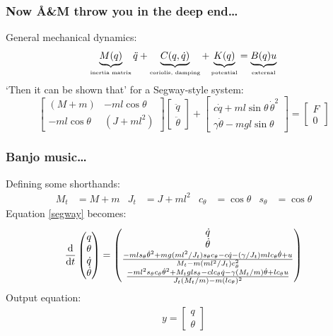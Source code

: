 \documentclass{beamer-control}
\begin{document}
\begin{frame}
\frametitle{Now Å\&M throw you in the deep end\dots}
General mechanical dynamics:
\begin{align}
\underbrace{M(q)}_{\text{\tiny inertia matrix}}\ddot q + \underbrace{C(q,\dot q)}_{\text{\tiny coriolis, damping}} + \underbrace{K(q)}_{\text{\tiny potential}} = \underbrace{B(q)u}_{\text{\tiny external}}
\end{align}
`Then it can be shown that' for a Segway-style system:
\begin{equation}
\begin{bmatrix}
(M + m) & -ml \cos\theta \\
-ml \cos\theta & (J + ml^2)
\end{bmatrix}
\begin{bmatrix}
\ddot{q} \\
\ddot{\theta}
\end{bmatrix}
+
\begin{bmatrix}
c\dot{q} + ml \sin\theta\, \dot{\theta}^2 \\
\gamma \dot{\theta} - mgl \sin\theta
\end{bmatrix}
=
\begin{bmatrix}
F \\
0
\end{bmatrix}
\label{eq:segway}
\end{equation}
\end{frame}


\begin{frame}
\frametitle{Banjo music\dots}
Defining some shorthands:
\begin{align}
M_t &= M+m & J_t&=J+ml^2 & c_\theta&=\cos\theta & s_\theta &= \cos\theta
\end{align}
Equation \eqref{segway} becomes:
\begin{equation}
\frac{\mathrm{d} }{\mathrm{d} t}
\begin{pmatrix}
q \\
\theta \\
\dot{q} \\
\dot{\theta}
\end{pmatrix}
=
\begin{pmatrix}
\dot{q} \\
\dot{\theta} \\
\frac{-ml s_\theta \dot{\theta}^2 + mg(ml^2/J_t) s_\theta c_\theta - c \dot{q} - (\gamma/J_t) ml c_\theta \dot{\theta} + u}
{M_t - m(ml^2/J_t) c_\theta^2} \\
\frac{-ml^2 s_\theta c_\theta \dot{\theta}^2 + M_t gl s_\theta - cl c_\theta \dot{q} - \gamma(M_t/m) \dot{\theta} + lc_\theta u}
{J_t (M_t/m) - m(lc_\theta)^2}
\end{pmatrix}
\end{equation}
Output equation:
\begin{align}
y = \begin{bmatrix}
q\\\theta
\end{bmatrix}
\end{align}

\end{frame}
\end{document}
